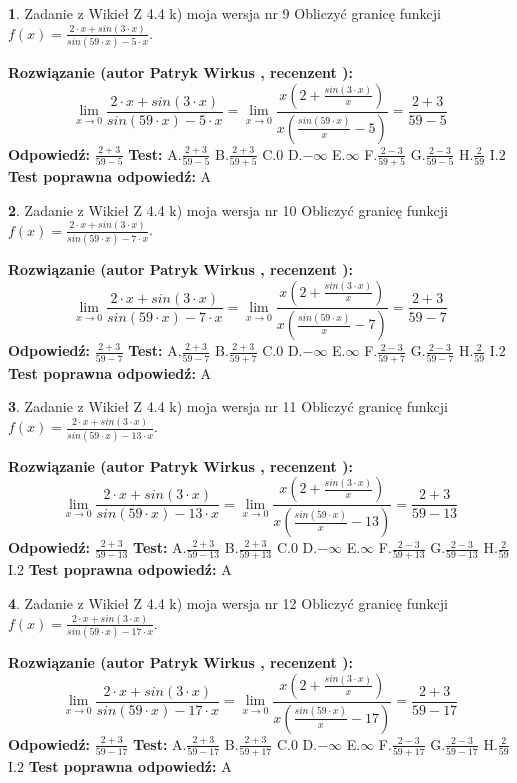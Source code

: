 \documentclass[12pt, a4paper]{article}
\theoremstyle{definition} %
\newtheorem{zad}{}
\newcommand{\zadStart}[1]{\begin{zad}#1\newline}
\newcommand{\zadStop}{\end{zad}}
\newcommand{\rozwStart}[2]{\noindent \textbf{Rozwiązanie (autor #1 , recenzent #2): }\newline}
\newcommand{\rozwStop}{\newline}
\newcommand{\odpStart}{\noindent \textbf{Odpowiedź:}\newline}
\newcommand{\odpStop}{\newline}
\newcommand{\testStart}{\noindent \textbf{Test:}\newline}
\newcommand{\testStop}{\newline}
\newcommand{\kluczStart}{\noindent \textbf{Test poprawna odpowiedź:}\newline}
\newcommand{\kluczStop}{\newline}
\begin{document}
\zadStart{Zadanie z Wikieł Z 4.4 k) moja wersja nr 9}
Obliczyć granicę funkcji $f(x)=\frac{2\cdot x +sin(3\cdot x)}{sin(59\cdot x) -5\cdot x}$.
\zadStop
\rozwStart{Patryk Wirkus}{}
$$\lim\limits_{x\to 0}\frac{2\cdot x +sin(3\cdot x)}{sin(59\cdot x) -5\cdot x}
=\lim\limits_{x\to 0}\frac{x(2+\frac{sin(3\cdot x)}{x})}{x(\frac{sin(59\cdot x)}{x}-5)}
=\frac{2+3}{59-5}$$
\rozwStop
\odpStart
$\frac{2+3}{59-5}$
\odpStop
\testStart
A.$\frac{2+3}{59-5}$
B.$\frac{2+3}{59+5}$
C.$0$
D.$-\infty$
E.$\infty$
F.$\frac{2-3}{59+5}$
G.$\frac{2-3}{59-5}$
H.$\frac{2}{59}$
I.$2$
\testStop
\kluczStart
A
\kluczStop



\zadStart{Zadanie z Wikieł Z 4.4 k) moja wersja nr 10}
Obliczyć granicę funkcji $f(x)=\frac{2\cdot x +sin(3\cdot x)}{sin(59\cdot x) -7\cdot x}$.
\zadStop
\rozwStart{Patryk Wirkus}{}
$$\lim\limits_{x\to 0}\frac{2\cdot x +sin(3\cdot x)}{sin(59\cdot x) -7\cdot x}
=\lim\limits_{x\to 0}\frac{x(2+\frac{sin(3\cdot x)}{x})}{x(\frac{sin(59\cdot x)}{x}-7)}
=\frac{2+3}{59-7}$$
\rozwStop
\odpStart
$\frac{2+3}{59-7}$
\odpStop
\testStart
A.$\frac{2+3}{59-7}$
B.$\frac{2+3}{59+7}$
C.$0$
D.$-\infty$
E.$\infty$
F.$\frac{2-3}{59+7}$
G.$\frac{2-3}{59-7}$
H.$\frac{2}{59}$
I.$2$
\testStop
\kluczStart
A
\kluczStop



\zadStart{Zadanie z Wikieł Z 4.4 k) moja wersja nr 11}
Obliczyć granicę funkcji $f(x)=\frac{2\cdot x +sin(3\cdot x)}{sin(59\cdot x) -13\cdot x}$.
\zadStop
\rozwStart{Patryk Wirkus}{}
$$\lim\limits_{x\to 0}\frac{2\cdot x +sin(3\cdot x)}{sin(59\cdot x) -13\cdot x}
=\lim\limits_{x\to 0}\frac{x(2+\frac{sin(3\cdot x)}{x})}{x(\frac{sin(59\cdot x)}{x}-13)}
=\frac{2+3}{59-13}$$
\rozwStop
\odpStart
$\frac{2+3}{59-13}$
\odpStop
\testStart
A.$\frac{2+3}{59-13}$
B.$\frac{2+3}{59+13}$
C.$0$
D.$-\infty$
E.$\infty$
F.$\frac{2-3}{59+13}$
G.$\frac{2-3}{59-13}$
H.$\frac{2}{59}$
I.$2$
\testStop
\kluczStart
A
\kluczStop



\zadStart{Zadanie z Wikieł Z 4.4 k) moja wersja nr 12}
Obliczyć granicę funkcji $f(x)=\frac{2\cdot x +sin(3\cdot x)}{sin(59\cdot x) -17\cdot x}$.
\zadStop
\rozwStart{Patryk Wirkus}{}
$$\lim\limits_{x\to 0}\frac{2\cdot x +sin(3\cdot x)}{sin(59\cdot x) -17\cdot x}
=\lim\limits_{x\to 0}\frac{x(2+\frac{sin(3\cdot x)}{x})}{x(\frac{sin(59\cdot x)}{x}-17)}
=\frac{2+3}{59-17}$$
\rozwStop
\odpStart
$\frac{2+3}{59-17}$
\odpStop
\testStart
A.$\frac{2+3}{59-17}$
B.$\frac{2+3}{59+17}$
C.$0$
D.$-\infty$
E.$\infty$
F.$\frac{2-3}{59+17}$
G.$\frac{2-3}{59-17}$
H.$\frac{2}{59}$
I.$2$
\testStop
\kluczStart
A
\kluczStop
\end{document}
